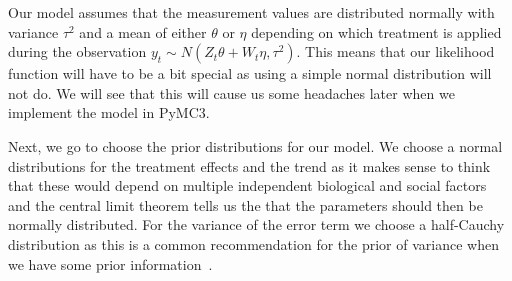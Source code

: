 \documentclass[12pt,a4paper,leqno]{report}
\theoremstyle{plain}
\theoremstyle{definition}
\theoremstyle{remark}
\begin{document}
Our model assumes that the measurement values are distributed normally with
variance \(\tau^2\) and a mean of either \(\theta \) or \(\eta \) depending on which
treatment is applied during the observation \(y_t \sim N(Z_t\theta + W_t\eta, \tau^2)\).
This means that our likelihood function will have to be a bit special as using a simple
normal distribution will not do. We will see that this will cause us some headaches
later when we implement the model in PyMC3.

Next, we go to choose the prior distributions for our model. We choose a
normal distributions for the treatment effects and the trend as it makes sense to think
that these would depend on multiple independent biological and social
factors and the central limit theorem tells us the that
the parameters should then be normally distributed. For the variance of the error
term we choose a half-Cauchy distribution as this is a common recommendation for the
prior of variance when we have some prior information\ \cite{variancepriors}.

\bigskip
{}
\bigskip
\end{document}
